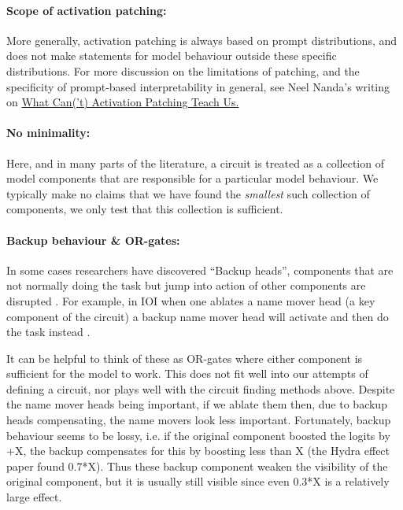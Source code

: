 \documentclass[nonatbib]{article}
\begin{document}
\paragraph{Scope of activation patching:} More generally, activation patching is always based on prompt distributions, and does not make statements for model behaviour outside these specific distributions. For more discussion on the limitations of patching, and the specificity of prompt-based interpretability in general, see Neel Nanda’s writing on
\href{https://www.neelnanda.io/mechanistic-interpretability/attribution-patching#what-cant-activation-patching-teach-us=}{What Can(’t) Activation Patching Teach Us.}

\paragraph{No minimality:} Here, and in many parts of the literature, a circuit is treated as a collection of model components that are responsible for a particular model behaviour. We typically make no claims that we have found the \textit{smallest} such collection of components, we only test that this collection is sufficient.

\paragraph{Backup behaviour \& OR-gates:} In some cases researchers have discovered “Backup heads”, components that are not normally doing the task but jump into action of other components are disrupted 
\citep[Hydra effect,][]{2023arXiv230715771M}.
For example, in IOI when one ablates a name mover head (a key component of the circuit) a backup name mover head will activate and then do the task instead \citep{IOI}.

It can be helpful to think of these as OR-gates where either component is sufficient for the model to work. This does not fit well into our attempts of defining a circuit, nor plays well with the circuit finding methods above. Despite the name mover heads being important, if we ablate them then, due to backup heads compensating, the name movers look less important. Fortunately, backup behaviour seems to be lossy, i.e. if the original component boosted the logits by +X, the backup compensates for this by boosting less than X (the Hydra effect paper found 0.7*X). Thus these backup component weaken the visibility of the original component, but it is usually still visible since even 0.3*X is a relatively large effect.
\end{document}

